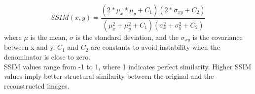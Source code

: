 \begin{enumerate}
    $$SSIM(x,y)= \frac{(2*\mu _x*\mu _y+C_1)(2*\sigma_{xy}+C_2)}{(\mu_x^2+\mu_y^2+C_1)(\sigma_x^2+\sigma_y^2+C_2)}$$
    where $\mu$ is the mean, $\sigma$ is the standard deviation, and the $\sigma_{xy}$ is the covariance between x and y. $C_1$ and $C_2$ are constants to avoid instability when the denominator is close to zero. \\
    SSIM values range from -1 to 1, where 1 indicates perfect similarity. Higher SSIM values imply better structural similarity between the original and the reconstructed images.
\end{enumerate}